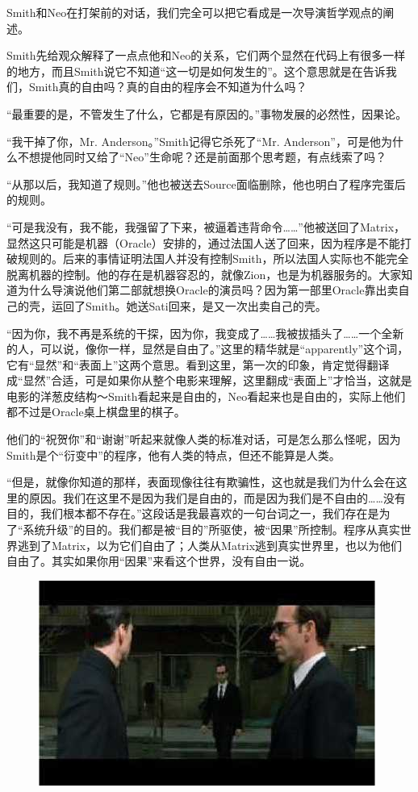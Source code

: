 \documentclass{ctexart}
\begin{document}
Smith和Neo在打架前的对话，我们完全可以把它看成是一次导演哲学观点的阐述。

Smith先给观众解释了一点点他和Neo的关系，它们两个显然在代码上有很多一样的地方，而且Smith说它不知道“这一切是如何发生的”。这个意思就是在告诉我们，Smith真的自由吗？真的自由的程序会不知道为什么吗？

“最重要的是，不管发生了什么，它都是有原因的。”事物发展的必然性，因果论。

“我干掉了你，Mr. Anderson。”Smith记得它杀死了“Mr. Anderson”，可是他为什么不想提他同时又给了“Neo”生命呢？还是前面那个思考题，有点线索了吗？

“从那以后，我知道了规则。”他也被送去Source面临删除，他也明白了程序完蛋后的规则。

“可是我没有，我不能，我强留了下来，被逼着违背命令……”他被送回了Matrix，显然这只可能是机器（Oracle）安排的，通过法国人送了回来，因为程序是不能打破规则的。后来的事情证明法国人并没有控制Smith，所以法国人实际也不能完全脱离机器的控制。他的存在是机器容忍的，就像Zion，也是为机器服务的。大家知道为什么导演说他们第二部就想换Oracle的演员吗？因为第一部里Oracle靠出卖自己的壳，运回了Smith。她送Sati回来，是又一次出卖自己的壳。

“因为你，我不再是系统的干探，因为你，我变成了……我被拔插头了……一个全新的人，可以说，像你一样，显然是自由了。”这里的精华就是“apparently”这个词，它有“显然”和“表面上”这两个意思。看到这里，第一次的印象，肯定觉得翻译成“显然”合适，可是如果你从整个电影来理解，这里翻成“表面上”才恰当，这就是电影的洋葱皮结构～Smith看起来是自由的，Neo看起来也是自由的，实际上他们都不过是Oracle桌上棋盘里的棋子。

他们的“祝贺你”和“谢谢”听起来就像人类的标准对话，可是怎么那么怪呢，因为Smith是个“衍变中”的程序，他有人类的特点，但还不能算是人类。

“但是，就像你知道的那样，表面现像往往有欺骗性，这也就是我们为什么会在这里的原因。我们在这里不是因为我们是自由的，而是因为我们是不自由的……没有目的，我们根本都不存在。”这段话是我最喜欢的一句台词之一，我们存在是为了“系统升级”的目的。我们都是被“目的”所驱使，被“因果”所控制。程序从真实世界逃到了Matrix，以为它们自由了；人类从Matrix逃到真实世界里，也以为他们自由了。其实如果你用“因果”来看这个世界，没有自由一说。

\begin{figure}[htb]
\centering
\includegraphics[width=0.5\linewidth]{fig/read_reloaded-72}
\end{figure}
\end{document}
